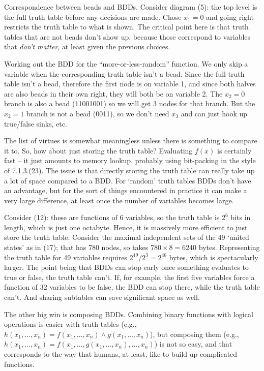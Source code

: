  Correspondence between beads and BDDs.\hfil\break
Consider diagram (5): the top level is the full truth table before any
decisions are made.  Chose $x_1 = 0$ and going right restricts
the truth table to what is shown.  The critical point here is that truth
tables that are not beads don't show up, because those correspond
to variables that {\it don't matter}, at least given the previous choices.

 Working out the BDD for the ``more-or-less-random''
function.\hfil\break
We only skip a variable when the corresponding truth table isn't a bead.  Since
the full truth table isn't a bead, therefore the first node is on variable 1, and
since both halves are also beads in their own right, they will both be on
variable 2.  The $x_2 = 0$ branch is also a bead (11001001) so we will
get 3 nodes for that branch.  But the $x_2 = 1$ branch is not a bead
(0011), so we don't need $x_3$ and can just hook up true/false sinks, etc.


\noindent [p 206] The list of virtues is somewhat meaningless unless there is something
to compare it to.  So, how about just storing the truth table?  Evaluating
$f\left(x\right)$ is certainly fast -- it just amounts to memory lookup, probably
using bit-packing in the style of 7.1.3.(23).  The issue is that directly
storing the truth table can really take up a lot of space compared to a BDD.
For `random' truth tables BDDs don't have an advantage, but for the
sort of things encountered in practice it can make a very large difference,
at least once the number of variables becomes large.  

Consider (12): these are functions of 6 variables, so the truth table is $2^6$ bits
in length, which is just one octabyte.  Hence, it is massively more efficient
to just store the truth table.  Consider the maximal independent sets of the
49 `united states' as in (17); that has 780 nodes, so takes $780 \times 8 = 6240$
bytes.  Representing the truth table for 49 variables requires $2^{49} / 2^3 = 2^{46}$
bytes, which is spectacularly larger.  The point being that BDDs can stop early
once something evaluates to true or false, the truth table can't.  If, for example,
the first five variables force a function of 32 variables to be false, the BDD
can stop there, while the truth table can't.  And sharing subtables can save
significant space as well.

The other big win is composing BDDs.  Combining binary functions with
logical operations is easier with truth tables (e.g., $h\left(x_1, \ldots, x_n\right)
= f\left(x_1, \ldots, x_n\right) \land g\left(x_1, \ldots, x_n\right)$), but
composing them (e.g., $h\left(x_1, \ldots, x_n\right) = f\left(x_1, \ldots,
g\left(x_1, \ldots, x_n\right), \ldots, x_n\right)$) is not so easy, and 
that corresponds to the way that humans, at least, like to build up complicated
functions.

